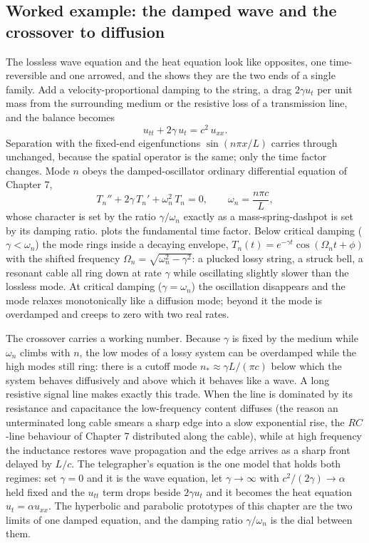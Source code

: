 

\subsection{Worked example: the damped wave and the crossover to diffusion}

The lossless wave equation and the heat equation look like opposites,
one time-reversible and one arrowed, and the  shows they are the two ends of a single family. Add a
velocity-proportional damping to the string, a drag $2\gamma u_{t}$
per unit mass from the surrounding medium or the resistive loss of a
transmission line, and the balance becomes
\[
u_{tt} + 2\gamma\, u_{t} = c^{2}\, u_{xx}.
\]
Separation with the fixed-end eigenfunctions $\sin(n\pi x/L)$ carries
through unchanged, because the spatial operator is the same; only the
time factor changes. Mode $n$ obeys the damped-oscillator ordinary
differential equation of Chapter 7,
\[
T_{n}'' + 2\gamma\, T_{n}' + \omega_{n}^{2}\, T_{n} = 0,
\qquad \omega_{n} = \frac{n\pi c}{L},
\]
whose character is set by the ratio $\gamma/\omega_{n}$ exactly as a
mass-spring-dashpot is set by its damping ratio.
 plots the fundamental time factor.
Below critical damping ($\gamma < \omega_{n}$) the mode rings inside a
decaying envelope, $T_{n}(t) = e^{-\gamma t}\cos(\Omega_{n}t + \phi)$
with the shifted frequency $\Omega_{n} = \sqrt{\omega_{n}^{2} -
\gamma^{2}}$: a plucked lossy string, a struck bell, a resonant cable
all ring down at rate $\gamma$ while oscillating slightly slower than
the lossless mode. At critical damping ($\gamma = \omega_{n}$) the
oscillation disappears and the mode relaxes monotonically like a
diffusion mode; beyond it the mode is overdamped and creeps to zero
with two real rates.

The crossover carries a working number. Because $\gamma$ is fixed by
the medium while $\omega_{n}$ climbs with $n$, the low modes of a
lossy system can be overdamped while the high modes still ring: there
is a cutoff mode $n_{*} \approx \gamma L/(\pi c)$ below which the
system behaves diffusively and above which it behaves like a wave. A
long resistive signal line makes exactly this trade. When the line is
dominated by its resistance and capacitance the low-frequency content
diffuses (the reason an unterminated long cable smears a sharp edge
into a slow exponential rise, the $RC$-line behaviour of Chapter 7
distributed along the cable), while at high frequency the inductance
restores wave propagation and the edge arrives as a sharp front
delayed by $L/c$. The telegrapher's equation is the one model that
holds both regimes: set $\gamma = 0$ and it is the wave equation, let
$\gamma \to \infty$ with $c^{2}/(2\gamma) \to \alpha$ held fixed and
the $u_{tt}$ term drops beside $2\gamma u_{t}$ and it becomes the heat
equation $u_{t} = \alpha u_{xx}$. The hyperbolic and parabolic
prototypes of this chapter are the two limits of one damped equation,
and the damping ratio $\gamma/\omega_{n}$ is the dial between them.

